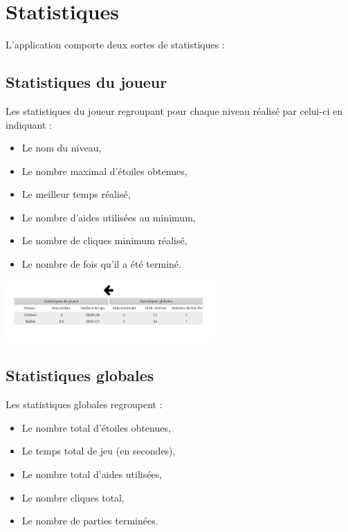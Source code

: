 \documentclass[a4paper, 12pt]{report}
\begin{document}
	
	\section{Statistiques}

		L'application comporte deux sortes de statistiques : 
		
		\subsection{Statistiques du joueur}
		
		    Les statistiques du joueur regroupant pour chaque niveau réalisé par celui-ci en indiquant :
		    \begin{itemize}
                    \item Le nom du niveau,
                    \item Le nombre maximal d'étoiles obtenues,
                    \item Le meilleur temps réalisé,
                    \item Le nombre d'aides utilisées au minimum,
                    \item Le nombre de cliques minimum réalisé,
                    \item Le nombre de fois qu'il a été terminé.
            \end{itemize}
		    
		    \begin{minipage}{\linewidth}
                    \centering
			        \includegraphics[width=8cm]{StatsJoueur.png}
	        \end{minipage}
		
		\subsection{Statistiques globales}

		    Les statistiques globales regroupent :
		    \begin{itemize}
                    \item Le nombre total d'étoiles obtenues,
                    \item Le temps total de jeu (en secondes),
                    \item Le nombre total d'aides utilisées,
                    \item Le nombre cliques total,
                    \item Le nombre de parties terminées.
            \end{itemize}
            
\end{document}
